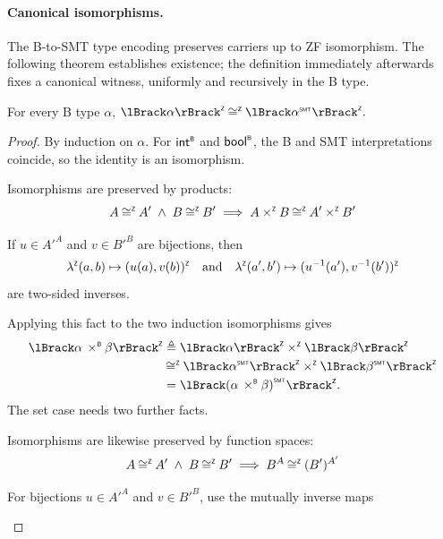 \paragraph{Canonical isomorphisms.}
The B-to-SMT type encoding preserves carriers up to ZF isomorphism.
The following theorem establishes existence; the definition immediately afterwards fixes a canonical witness, uniformly and recursively in the B type.

\begin{theorem}
  \label{thm:beer-btype-iso}
  For every B type \(\alpha\),
  \(
    \interpZ{\alpha} \mathbin{\zop{\cong}} \interpZ{\toSMT{\alpha}}.
  \)
\end{theorem}

\begin{proof}
  By induction on \(\alpha\).
  For \(\mathsf{int}^{\scriptscriptstyle{\mathsf{B}}}\) and \(\mathsf{bool}^{\scriptscriptstyle{\mathsf{B}}}\), the B and SMT interpretations coincide, so the identity is an isomorphism.
  \begin{fact}
    Isomorphisms are preserved by products:
    \[
      A \mathbin{\cong^{\scriptscriptstyle{\mathsf{Z}}}} A' \;\land\; B \mathbin{\cong^{\scriptscriptstyle{\mathsf{Z}}}} B' \implies
      A \mathbin{\times^{\scriptscriptstyle{\mathsf{Z}}}} B \mathbin{\cong^{\scriptscriptstyle{\mathsf{Z}}}} A' \mathbin{\times^{\scriptscriptstyle{\mathsf{Z}}}} B'
    \]
  \end{fact}
  \begin{subproof}
    If \(u \in A'^A\) and \(v \in B'^B\) are bijections, then
    \[
      \lambda^{\scriptscriptstyle{\mathsf{Z}}} (a,b) \mapsto \lparen u(a), v(b)\rparen^{\scriptscriptstyle{\mathsf{Z}}} \quad\text{and}\quad \lambda^{\scriptscriptstyle{\mathsf{Z}}} (a',b') \mapsto \lparen u^{-1}(a'), v^{-1}(b')\rparen^{\scriptscriptstyle{\mathsf{Z}}}
    \] are two-sided inverses.
  \end{subproof}
  Applying this fact to the two induction isomorphisms gives
  \[
    \begin{aligned}
      \interpZ{\alpha \prodB \beta}
      &\triangleq \interpZ{\alpha} \timesZ \interpZ{\beta} \\
      &\mathbin{\zop{\cong}} \interpZ{\toSMT{\alpha}} \timesZ \interpZ{\toSMT{\beta}} \\
      &= \interpZ{\toSMT{(\alpha \prodB \beta)}}.
    \end{aligned}
  \]
  The set case needs two further facts.
  \begin{fact}
    Isomorphisms are likewise preserved by function spaces:
    \[
      A \mathbin{\cong^{\scriptscriptstyle{\mathsf{Z}}}} A' \;\land\; B \mathbin{\cong^{\scriptscriptstyle{\mathsf{Z}}}} B' \implies
      B^A \mathbin{\cong^{\scriptscriptstyle{\mathsf{Z}}}} (B')^{A'}
    \]
  \end{fact}
  \begin{subproof}
    For bijections \(u \in A'^A\) and \(v \in B'^B\), use the mutually inverse maps

\end{subproof}
\end{proof}
